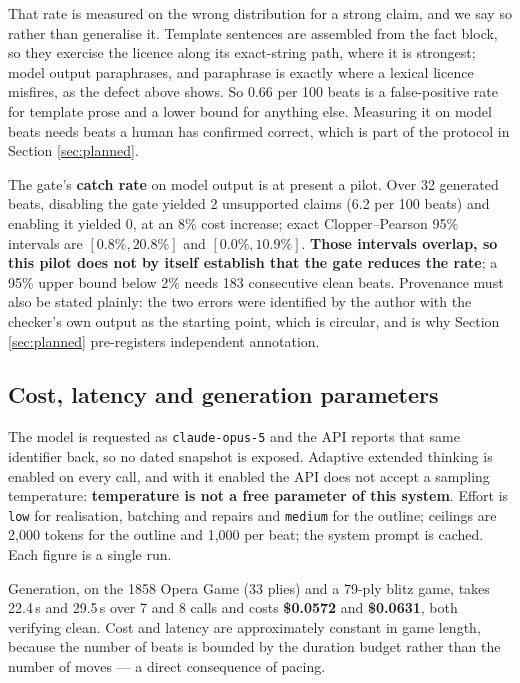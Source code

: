 \documentclass[conference]{IEEEtran}
\begin{document}
That rate is measured on the wrong distribution for a strong claim, and we
say so rather than generalise it. Template sentences are assembled from the
fact block, so they exercise the licence along its exact-string path, where
it is strongest; model output paraphrases, and paraphrase is exactly where a
lexical licence misfires, as the defect above shows. So 0.66 per 100 beats
is a false-positive rate for template prose and a lower bound for anything
else. Measuring it on model beats needs beats a human has confirmed correct,
which is part of the protocol in Section \ref{sec:planned}.

The gate's \textbf{catch rate} on model output is at present a pilot. Over
32 generated beats, disabling the gate yielded 2 unsupported claims (6.2 per
100 beats) and enabling it yielded 0, at an 8\% cost increase; exact
Clopper--Pearson 95\% intervals are $[0.8\%, 20.8\%]$ and $[0.0\%, 10.9\%]$.
\textbf{Those intervals overlap, so this pilot does not by itself establish
that the gate reduces the rate}; a 95\% upper bound below 2\% needs 183
consecutive clean beats. Provenance must also be stated plainly: the two
errors were identified by the author with the checker's own output as the
starting point, which is circular, and is why Section \ref{sec:planned}
pre-registers independent annotation.

\subsection{Cost, latency and generation parameters}

The model is requested as \texttt{claude-opus-5} and the API reports that
same identifier back, so no dated snapshot is exposed. Adaptive extended
thinking is enabled on every call, and with it enabled the API does not
accept a sampling temperature: \textbf{temperature is not a free parameter
of this system}. Effort is \texttt{low} for realisation, batching and
repairs and \texttt{medium} for the outline; ceilings are 2,000 tokens for
the outline and 1,000 per beat; the system prompt is cached. Each figure is
a single run.

Generation, on the 1858 Opera Game (33 plies) and a 79-ply blitz game, takes
22.4\,s and 29.5\,s over 7 and 8 calls and costs \textbf{\$0.0572} and
\textbf{\$0.0631}, both verifying clean. Cost and latency are approximately
constant in game length, because the number of beats is bounded by the
duration budget rather than the number of moves --- a direct consequence of
pacing.
\end{document}
